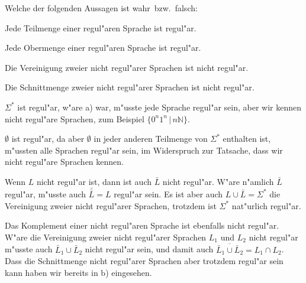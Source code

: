 Welche der folgenden Aussagen ist wahr~bzw.~falsch:
\begin{teilaufgaben}
\item Jede Teilmenge einer regul"aren Sprache ist regul"ar.
\item Jede Obermenge einer regul"aren Sprache ist regul"ar.
\item Die Vereinigung zweier nicht regul"arer Sprachen ist nicht regul"ar.
\item Die Schnittmenge zweier nicht regul"arer Sprachen ist nicht
regul"ar.
\end{teilaufgaben}

\begin{loesung}
\begin{teilaufgaben}
\item $\Sigma^*$ ist regul"ar, w"are a) war, m"usste jede Sprache regul"ar
sein, aber wir kennen nicht regul"are Sprachen, zum Beispiel
$\{0^n1^n\,|\,n\mathbb N\}$.
\item $\emptyset$ ist regul"ar, da aber $\emptyset$ in jeder anderen
Teilmenge von $\Sigma^*$ enthalten ist, m"ussten alle Sprachen regul"ar
sein, im Widerspruch zur Tatsache, dass wir nicht regul"are Sprachen
kennen.
\item Wenn $L$ nicht regul"ar ist, dann ist auch $\bar L$ nicht regul"ar.
W"are n"amlich $\bar L$ regul"ar, m"usste auch $\bar{\bar L}=L$ regul"ar
sein. Es ist aber auch $L\cup \bar L=\Sigma^*$ die Vereinigung zweier
nicht regul"arer Sprachen, trotzdem ist $\Sigma^*$ nat"urlich regul"ar.
\item Das Komplement einer nicht regul"aren Sprache ist ebenfalls nicht
regul"ar. W"are die Vereinigung zweier nicht regul"arer Sprachen $L_1$
und $L_2$ nicht regul"ar m"usste auch $\bar L_1\cup \bar L_2$ nicht
regul"ar sein, und damit auch $\overline{\bar L_1\cup \bar L_2}=L_1\cap L_2$.
Dass die Schnittmenge nicht regul"arer Sprachen aber trotzdem regul"ar
sein kann haben wir bereits in b) eingesehen.
\end{teilaufgaben}
\end{loesung}

